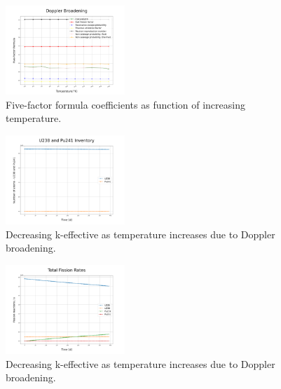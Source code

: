 \documentclass[twocolumn,a4paper,10pt]{article}
\begin{document}
\begin{figure}[ht]
  \centering
  \includegraphics[width=0.4\textwidth]{../Pictures/Doppler_Five.png}
  \caption{Five-factor formula coefficients as function of increasing temperature.}
  \label{fig:Dopp5FF}
\end{figure}

\begin{figure}[ht]
  \centering
  \includegraphics[width=0.4\textwidth]{../Pictures/Depletion_U238_Pu241.png}
  \caption{Decreasing k-effective as temperature increases due to Doppler broadening.}
  \label{fig:U238vsPu241}
\end{figure}

\begin{figure}[ht]
  \centering
  \includegraphics[width=0.4\textwidth]{../Pictures/Depletion_Fission.png}
  \caption{Decreasing k-effective as temperature increases due to Doppler broadening.}
  \label{fig:totalfission}
\end{figure}
\end{document}
